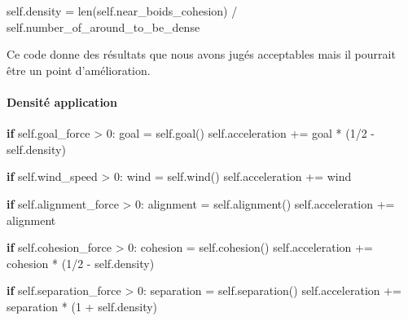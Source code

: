 \documentclass[
]{article}
\newenvironment{Shaded}{}{}
\newcommand{\BuiltInTok}[1]{#1}
\newcommand{\ControlFlowTok}[1]{\textcolor[rgb]{0.00,0.44,0.13}{\textbf{#1}}}
\newcommand{\DecValTok}[1]{\textcolor[rgb]{0.25,0.63,0.44}{#1}}
\newcommand{\NormalTok}[1]{#1}
\newcommand{\OperatorTok}[1]{\textcolor[rgb]{0.40,0.40,0.40}{#1}}
\newcommand{\VariableTok}[1]{\textcolor[rgb]{0.10,0.09,0.49}{#1}}
\begin{document}
\begin{Shaded}
\begin{Highlighting}[]
\VariableTok{self}\NormalTok{.density }\OperatorTok{=} \BuiltInTok{len}\NormalTok{(}\VariableTok{self}\NormalTok{.near\_boids\_cohesion) }\OperatorTok{/} \VariableTok{self}\NormalTok{.number\_of\_around\_to\_be\_dense}
\end{Highlighting}
\end{Shaded}

Ce code donne des résultats que nous avons jugés acceptables mais il
pourrait être un point d'amélioration.

\hypertarget{densituxe9-application}{%
\paragraph{Densité application}\label{densituxe9-application}}

\begin{Shaded}
\begin{Highlighting}[]
        \ControlFlowTok{if} \VariableTok{self}\NormalTok{.goal\_force }\OperatorTok{\textgreater{}} \DecValTok{0}\NormalTok{:}
\NormalTok{            goal }\OperatorTok{=} \VariableTok{self}\NormalTok{.goal()}
            \VariableTok{self}\NormalTok{.acceleration }\OperatorTok{+=}\NormalTok{ goal }\OperatorTok{*}\NormalTok{ (}\DecValTok{1}\OperatorTok{/}\DecValTok{2} \OperatorTok{{-}} \VariableTok{self}\NormalTok{.density)}

        \ControlFlowTok{if} \VariableTok{self}\NormalTok{.wind\_speed }\OperatorTok{\textgreater{}} \DecValTok{0}\NormalTok{:}
\NormalTok{            wind }\OperatorTok{=} \VariableTok{self}\NormalTok{.wind()}
            \VariableTok{self}\NormalTok{.acceleration }\OperatorTok{+=}\NormalTok{ wind}

        \ControlFlowTok{if} \VariableTok{self}\NormalTok{.alignment\_force }\OperatorTok{\textgreater{}} \DecValTok{0}\NormalTok{:}
\NormalTok{            alignment }\OperatorTok{=} \VariableTok{self}\NormalTok{.alignment()}
            \VariableTok{self}\NormalTok{.acceleration }\OperatorTok{+=}\NormalTok{ alignment}

        \ControlFlowTok{if} \VariableTok{self}\NormalTok{.cohesion\_force }\OperatorTok{\textgreater{}} \DecValTok{0}\NormalTok{:}
\NormalTok{            cohesion }\OperatorTok{=} \VariableTok{self}\NormalTok{.cohesion()}
            \VariableTok{self}\NormalTok{.acceleration }\OperatorTok{+=}\NormalTok{ cohesion }\OperatorTok{*}\NormalTok{ (}\DecValTok{1}\OperatorTok{/}\DecValTok{2} \OperatorTok{{-}} \VariableTok{self}\NormalTok{.density)}

        \ControlFlowTok{if} \VariableTok{self}\NormalTok{.separation\_force }\OperatorTok{\textgreater{}} \DecValTok{0}\NormalTok{:}
\NormalTok{            separation }\OperatorTok{=} \VariableTok{self}\NormalTok{.separation()}
            \VariableTok{self}\NormalTok{.acceleration }\OperatorTok{+=}\NormalTok{ separation }\OperatorTok{*}\NormalTok{ (}\DecValTok{1} \OperatorTok{+} \VariableTok{self}\NormalTok{.density)}
\end{Highlighting}
\end{Shaded}
\end{document}
